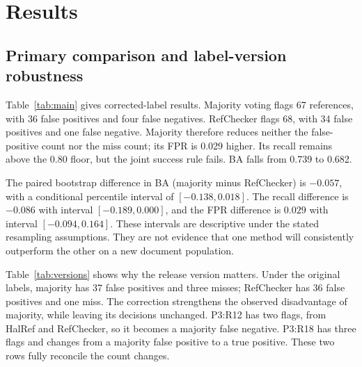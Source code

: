 \documentclass[acmsmall,screen,nonacm]{acmart}
\begin{document}
\section{Results}
\subsection{Primary comparison and label-version robustness}
Table~\ref{tab:main} gives corrected-label results. Majority voting flags 67 references, with 36 false positives and four false negatives. RefChecker flags 68, with 34 false positives and one false negative. Majority therefore reduces neither the false-positive count nor the miss count; its FPR is 0.029 higher. Its recall remains above the 0.80 floor, but the joint success rule fails. BA falls from 0.739 to 0.682.

\begin{table}[tb]
\caption{Measured results on corrected v1.1.0 labels: 35 problematic and 69 verified references. Single-checker rows replay released decisions. Held-out selection is evaluated using only out-of-document predictions.}\label{tab:main}
\centering\small

\end{table}

The paired bootstrap difference in BA (majority minus RefChecker) is $-0.057$, with a conditional percentile interval of $[-0.138,0.018]$. The recall difference is $-0.086$ with interval $[-0.189,0.000]$, and the FPR difference is $0.029$ with interval $[-0.094,0.164]$. These intervals are descriptive under the stated resampling assumptions. They are not evidence that one method will consistently outperform the other on a new document population.

Table~\ref{tab:versions} shows why the release version matters. Under the original labels, majority has 37 false positives and three misses; RefChecker has 36 false positives and one miss. The correction strengthens the observed disadvantage of majority, while leaving its decisions unchanged. P3:R12 has two flags, from HalRef and RefChecker, so it becomes a majority false negative. P3:R18 has three flags and changes from a majority false positive to a true positive. These two rows fully reconcile the count changes.

\begin{table}[tb]
\caption{Historical reproduction and corrected-label robustness. These are the same references and recorded flags with revised labels, not independent datasets.}\label{tab:versions}
\centering\small

\end{table}
\end{document}
